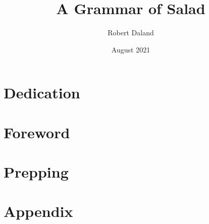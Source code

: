 \documentclass[12pt]{book}
\title{ {A Grammar of Salad} }
\author{Robert Daland}
\date{August 2021}
\begin{document}
\maketitle
\chapter*{Dedication} 
\chapter*{Foreword} 
\tableofcontents
\chapter{Prepping} 
\chapter{Appendix} 
\end{document}
